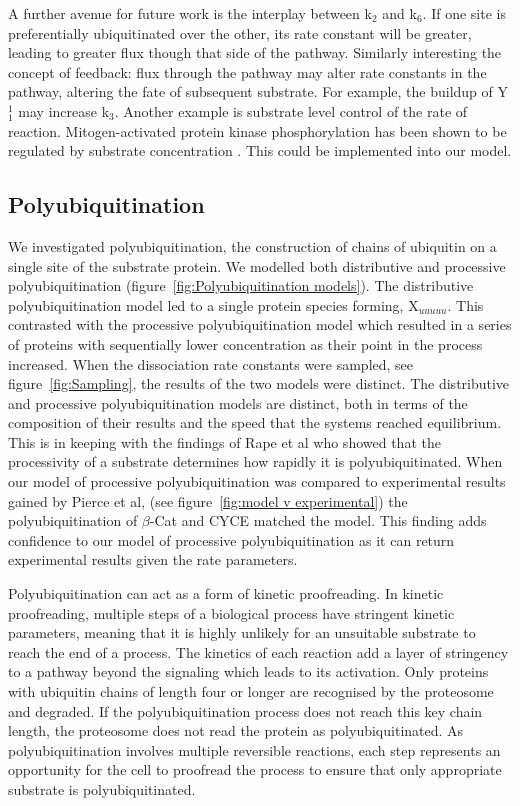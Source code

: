 \documentclass[11pt]{article}
\begin{document}
A further avenue for future work is the interplay between k$_{2}$ and k$_6$. If one site is preferentially ubiquitinated over the other, its rate constant will be greater, leading to greater flux though that side of the pathway. Similarly interesting the concept of feedback: flux through the pathway may alter rate constants in the pathway, altering the fate of subsequent substrate. For example, the buildup of Y$^1_1$ may increase k$_3$. Another example is substrate level control of the rate of reaction. Mitogen-activated protein kinase phosphorylation has been shown to be regulated by substrate concentration \cite{kim2011substrate}. This could be implemented into our model.

\subsection{Polyubiquitination}
We investigated polyubiquitination, the construction of chains of ubiquitin on a single site of the substrate protein. We modelled both distributive and processive polyubiquitination (figure~\ref{fig:Polyubiquitination models}). The distributive polyubiquitination model led to a single protein species forming, X$_{uuuuu}$. This contrasted with the processive polyubiquitination model which resulted in a series of proteins with sequentially lower concentration as their point in the process increased. When the dissociation rate constants were sampled, see figure~\ref{fig:Sampling}, the results of the two models were distinct. The distributive and processive polyubiquitination models are distinct, both in terms of the composition of their results and the speed that the systems reached equilibrium. This is in keeping with the findings of Rape et al\cite{rape2006processivity} who showed that the processivity of a substrate determines how rapidly it is polyubiquitinated. When our model of processive polyubiquitination was compared to experimental results gained by Pierce et al\cite{pierce2009detection}, (see figure~\ref{fig:model v experimental}) the polyubiquitination of $\beta$-Cat and CYCE matched the model. This finding adds confidence to our model of processive polyubiquitination as it can return experimental results given the rate parameters.

Polyubiquitination can act as a form of kinetic proofreading\cite{hopfield1974kinetic}. In kinetic proofreading, multiple steps of a biological process have stringent kinetic parameters, meaning that it is highly unlikely for an unsuitable substrate to reach the end of a process. The kinetics of each reaction add a layer of stringency to a pathway beyond the signaling which leads to its activation. Only proteins with ubiquitin chains of length four or longer are recognised by the proteosome\cite{thrower2000recognition} and degraded. If the polyubiquitination process does not reach this key chain length, the proteosome does not read the protein as polyubiquitinated. As polyubiquitination involves multiple reversible reactions, each step represents an opportunity for the cell to proofread the process to ensure that only appropriate substrate is polyubiquitinated.
\end{document}
